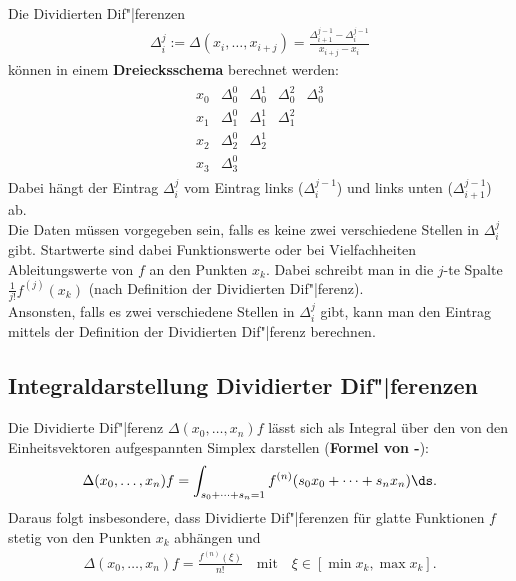 Die Dividierten Dif"|ferenzen
\begin{align*}
    \Delta_i^j := \Delta(x_i, \dotsc, x_{i+j})
    = \frac{\Delta_{i+1}^{j-1} - \Delta_i^{j-1}}{x_{i+j} - x_i}
\end{align*}
können in einem \textbf{Dreiecksschema} berechnet werden:
\begin{align*}
    \begin{array}{c||cccc}
        x_0 & \Delta_0^0 & \Delta_0^1 & \Delta_0^2 & \Delta_0^3 \\
        x_1 & \Delta_1^0 & \Delta_1^1 & \Delta_1^2 \\
        x_2 & \Delta_2^0 & \Delta_2^1 \\
        x_3 & \Delta_3^0
    \end{array}
\end{align*}
Dabei hängt der Eintrag $\Delta_i^j$ vom Eintrag links ($\Delta_i^{j-1}$) und
links unten ($\Delta_{i+1}^{j-1}$) ab. \\
Die Daten müssen vorgegeben sein, falls es keine zwei verschiedene Stellen
in $\Delta_i^j$ gibt.
Startwerte sind dabei Funktionswerte oder bei Vielfachheiten Ableitungswerte
von $f$ an den Punkten $x_k$.
Dabei schreibt man in die $j$-te Spalte $\frac{1}{j!} f^{(j)}(x_k)$
(nach Definition der Dividierten Dif"|ferenz). \\
Ansonsten, falls es zwei verschiedene Stellen in $\Delta_i^j$ gibt, kann man
den Eintrag mittels der Definition der Dividierten Dif"|ferenz berechnen.

\subsection{%
    Integraldarstellung Dividierter Dif"|ferenzen%
}

Die Dividierte Dif"|ferenz $\Delta(x_0, \dotsc, x_n)f$ lässt sich als
Integral über den von den Einheitsvektoren aufgespannten Simplex
darstellen (\textbf{Formel von -}):
\begin{align*}
    \Delta(x_0, \dotsc, x_n)f
    = \int_{s_0 + \dotsb + s_n = 1} f^{(n)}(s_0 x_0 + \dotsb + s_n x_n)\ds.
\end{align*}
Daraus folgt insbesondere, dass Dividierte Dif"|ferenzen für glatte Funktionen
$f$ stetig von den Punkten $x_k$ abhängen und
\begin{align*}
    \Delta(x_0, \dotsc, x_n)f = \frac{f^{(n)}(\xi)}{n!} \quad\text{mit}\quad
    \xi \in [\min x_k, \max x_k].
\end{align*}

